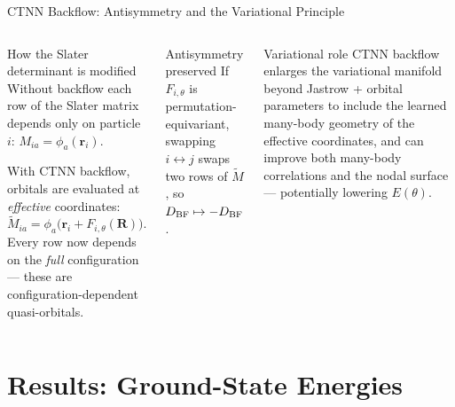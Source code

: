 \documentclass[aspectratio=169,10pt]{beamer}
\begin{document}
\begin{frame}{CTNN Backflow: Antisymmetry and the Variational Principle}
  \begin{columns}[T]
      \begin{block}{How the Slater determinant is modified}
        Without backflow each row of the Slater matrix depends only on
        particle $i$: $M_{ia}=\phi_a(\mathbf{r}_i)$.

        \smallskip
        With CTNN backflow, orbitals are evaluated at \emph{effective}
        coordinates:
        \[
          \widetilde{M}_{ia}
          = \phi_a\!\bigl(\mathbf{r}_i+F_{i,\theta}(\mathbf{R})\bigr).
        \]
        Every row now depends on the \emph{full} configuration — these
        are configuration-dependent quasi-orbitals.
      \end{block}
      \begin{block}{Antisymmetry preserved}
        If $F_{i,\theta}$ is permutation-equivariant,
        swapping $i\leftrightarrow j$ swaps two rows of
        $\widetilde{M}$, so
        $D_{\rm BF}\mapsto -D_{\rm BF}$. \checkmark
      \end{block}
      \vspace{0.3cm}
      \begin{alertblock}{Variational role}
        CTNN backflow enlarges the variational manifold beyond
        Jastrow + orbital parameters to include the learned
        many-body geometry of the effective coordinates, and
        can improve both many-body correlations and the nodal
        surface — potentially lowering $E(\theta)$.
      \end{alertblock}
  \end{columns}
\end{frame}



\section{Results: Ground-State Energies}



\end{document}
